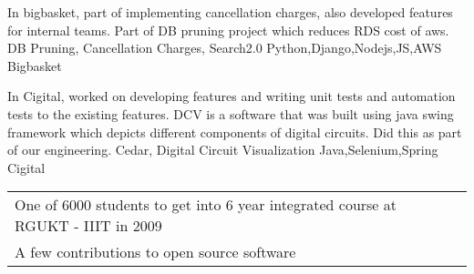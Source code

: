 \documentclass[]{awesome-cv}
\begin{document}
\vspace{-10mm}
\begin{cventries}
	\cventry
	{In bigbasket, part of implementing cancellation charges, also developed features for internal teams. Part of DB pruning project which reduces RDS cost of aws.}
	{DB Pruning, Cancellation Charges, Search2.0}
	{Python,Django,Nodejs,JS,AWS}
	{Bigbasket}
	{}
	
	\vspace{-5mm}
\end{cventries}
\begin{cventries}
	\cventry
	{In Cigital, worked on developing features and writing unit tests and automation tests to the existing features. DCV is a software that was built using java swing framework which depicts different components of digital circuits. Did this as part of our engineering.}
	{Cedar, Digital Circuit Visualization}
	{Java,Selenium,Spring}
	{Cigital}
	{}
	
	\vspace{-5mm}
\end{cventries}
\begin{cventries}
	\cventry
	{}
	{
	{\def\arraystretch{1.15}{\begin{tabular}{ l l }
		One of 6000 students to get into 6 year integrated course at RGUKT - IIIT in 2009 \\
		A few contributions to open source software\\
		\end{tabular}}}}
	{}
	{}
	{}
	
	\vspace{-5mm}
\end{cventries}

%	
 
\end{document}
